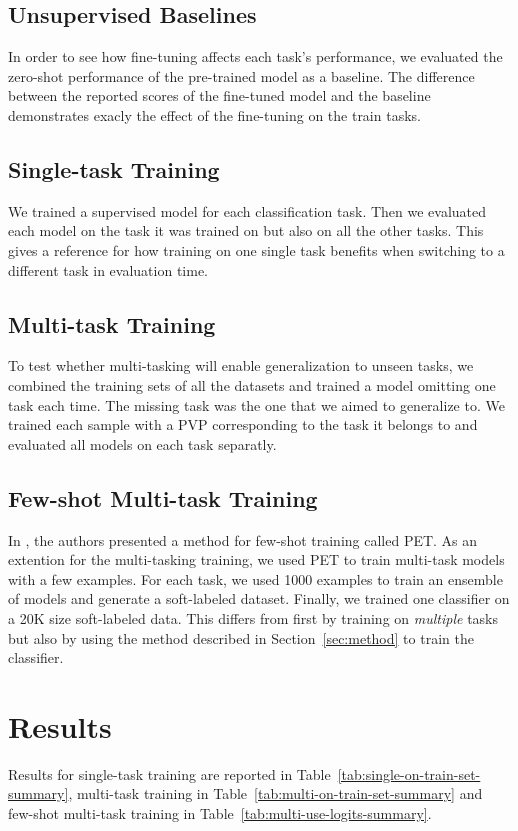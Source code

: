 \documentclass[11pt,a4paper]{article}
\begin{document}
\subsection{Unsupervised Baselines}
In order to see how fine-tuning affects each task's performance, we evaluated the zero-shot performance of the pre-trained model as a baseline.
The difference between the reported scores of the fine-tuned model and the baseline demonstrates exacly the effect of the fine-tuning on the train tasks.

\subsection{Single-task Training}
We trained a supervised model for each classification task.
Then we evaluated each model on the task it was trained on but also on all the other tasks.
This gives a reference for how training on one single task benefits when switching to a different task in evaluation time.

\subsection{Multi-task Training}
To test whether multi-tasking will enable generalization to unseen tasks, we combined the training sets of all the datasets and trained a model omitting one task each time.
The missing task was the one that we aimed to generalize to.
We trained each sample with a PVP corresponding to the task it belongs to and evaluated all models on each task separatly.

\subsection{Few-shot Multi-task Training}
In \citet{schick2020exploiting}, the authors presented a method for few-shot training called PET.
As an extention for the multi-tasking training, we used PET to train multi-task models with a few examples.
For each task, we used 1000 examples to train an ensemble of models and generate a soft-labeled dataset.
Finally, we trained one classifier on a 20K size soft-labeled data.
This differs from \citet{schick2020exploiting} first by training on \textit{multiple} tasks but also by using the method described in Section~\ref{sec:method} to train the classifier.

\section{Results}
Results for single-task training are reported in Table~\ref{tab:single-on-train-set-summary},
multi-task training in Table~\ref{tab:multi-on-train-set-summary}
and few-shot multi-task training in Table~\ref{tab:multi-use-logits-summary}.
\end{document}
